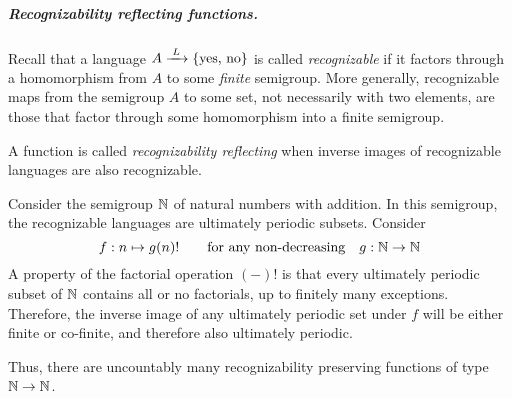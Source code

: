 \subparagraph{Recognizability reflecting functions.} Recall that a language $A \xrightarrow{\;L\;} \{\text{yes, no}\}$
is called \emph{recognizable} if it factors through a homomorphism from $A$ to some \emph{finite} semigroup.  More generally, recognizable maps from the semigroup $A$ to some set, not necessarily with two elements, are those that factor through some homomorphism into a finite semigroup.
\begin{definition}
    A function is called \emph{recognizability reflecting} when
    inverse images of recognizable languages are also recognizable.
\end{definition}
\begin{example}
    Consider the semigroup ${\mathbb N}$ of natural numbers with addition. In this semigroup, the recognizable languages are ultimately periodic subsets. Consider
    \[ f : n \mapsto g(n)! \qquad\text{for any non-decreasing}\quad g : {\mathbb N} \to {\mathbb N} \]
    A property of the factorial operation $(-)!$ is that every ultimately periodic subset of ${\mathbb N}$ contains all or no factorials, up to finitely many exceptions. Therefore, the inverse image of any ultimately periodic set under $f$ will be either finite or co-finite, and therefore also ultimately periodic.
    
    Thus, there are uncountably many recognizability preserving functions of type ${\mathbb N} \to {\mathbb N}$.
\end{example}

